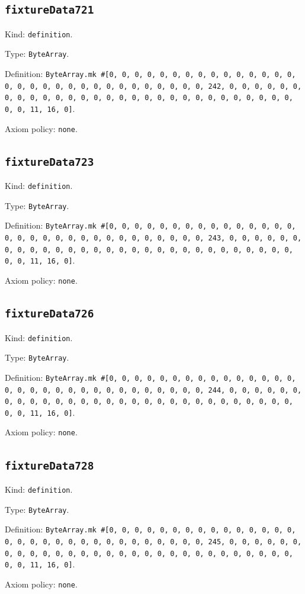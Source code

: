 \documentclass[11pt]{article}
\begin{document}
\subsection*{\texttt{fixtureData721}}
\noindent Kind: \texttt{definition}.\par
\noindent Type: \texttt{ByteArray}.\par
\noindent Definition: \texttt{ByteArray.mk \#[0, 0, 0, 0, 0, 0, 0, 0, 0, 0, 0, 0, 0, 0, 0, 0, 0, 0, 0, 0, 0, 0, 0, 0, 0, 0, 0, 0, 0, 0, 0, 242, 0, 0, 0, 0, 0, 0, 0, 0, 0, 0, 0, 0, 0, 0, 0, 0, 0, 0, 0, 0, 0, 0, 0, 0, 0, 0, 0, 0, 0, 0, 0, 11, 16, 0]}.\par
\noindent Axiom policy: \texttt{none}.\par
\subsection*{\texttt{fixtureData723}}
\noindent Kind: \texttt{definition}.\par
\noindent Type: \texttt{ByteArray}.\par
\noindent Definition: \texttt{ByteArray.mk \#[0, 0, 0, 0, 0, 0, 0, 0, 0, 0, 0, 0, 0, 0, 0, 0, 0, 0, 0, 0, 0, 0, 0, 0, 0, 0, 0, 0, 0, 0, 0, 243, 0, 0, 0, 0, 0, 0, 0, 0, 0, 0, 0, 0, 0, 0, 0, 0, 0, 0, 0, 0, 0, 0, 0, 0, 0, 0, 0, 0, 0, 0, 0, 11, 16, 0]}.\par
\noindent Axiom policy: \texttt{none}.\par
\subsection*{\texttt{fixtureData726}}
\noindent Kind: \texttt{definition}.\par
\noindent Type: \texttt{ByteArray}.\par
\noindent Definition: \texttt{ByteArray.mk \#[0, 0, 0, 0, 0, 0, 0, 0, 0, 0, 0, 0, 0, 0, 0, 0, 0, 0, 0, 0, 0, 0, 0, 0, 0, 0, 0, 0, 0, 0, 0, 244, 0, 0, 0, 0, 0, 0, 0, 0, 0, 0, 0, 0, 0, 0, 0, 0, 0, 0, 0, 0, 0, 0, 0, 0, 0, 0, 0, 0, 0, 0, 0, 11, 16, 0]}.\par
\noindent Axiom policy: \texttt{none}.\par
\subsection*{\texttt{fixtureData728}}
\noindent Kind: \texttt{definition}.\par
\noindent Type: \texttt{ByteArray}.\par
\noindent Definition: \texttt{ByteArray.mk \#[0, 0, 0, 0, 0, 0, 0, 0, 0, 0, 0, 0, 0, 0, 0, 0, 0, 0, 0, 0, 0, 0, 0, 0, 0, 0, 0, 0, 0, 0, 0, 245, 0, 0, 0, 0, 0, 0, 0, 0, 0, 0, 0, 0, 0, 0, 0, 0, 0, 0, 0, 0, 0, 0, 0, 0, 0, 0, 0, 0, 0, 0, 0, 11, 16, 0]}.\par
\noindent Axiom policy: \texttt{none}.\par
\end{document}
